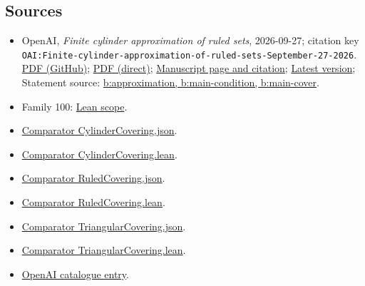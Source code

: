 \documentclass[11pt]{article}
\begin{document}
\subsection{Sources}
\begin{itemize}
\item OpenAI, \emph{Finite cylinder approximation of ruled sets}, 2026-09-27; citation key \texttt{OAI:Finite-cylinder-approximation-of-ruled-sets-September-27-2026}. \href{https://github.com/openai/math/blob/adc7f1241b42e322a6451854ab7e4b4c146bf78a/preprints/Finite-cylinder-approximation-of-ruled-sets-September-27-2026/main.pdf}{PDF (GitHub)}; \href{https://github.com/openai/math/raw/adc7f1241b42e322a6451854ab7e4b4c146bf78a/preprints/Finite-cylinder-approximation-of-ruled-sets-September-27-2026/main.pdf}{PDF (direct)}; \href{https://github.com/openai/math/blob/adc7f1241b42e322a6451854ab7e4b4c146bf78a/preprints/Finite-cylinder-approximation-of-ruled-sets-September-27-2026/README.md}{Manuscript page and citation}; \href{https://github.com/openai/math/blob/main/preprints/Finite-cylinder-approximation-of-ruled-sets-September-27-2026/main.pdf}{Latest version}; Statement source: \href{https://github.com/openai/math/blob/adc7f1241b42e322a6451854ab7e4b4c146bf78a/preprints/Finite-cylinder-approximation-of-ruled-sets-September-27-2026/build/sections/introduction.tex\#L74}{b:approximation, b:main-condition, b:main-cover}.
\item Family 100: \href{https://github.com/openai/math/blob/adc7f1241b42e322a6451854ab7e4b4c146bf78a/lean/docs/100.md}{Lean scope}.
\item \href{https://github.com/openai/math/blob/adc7f1241b42e322a6451854ab7e4b4c146bf78a/lean/ComparatorChallenges/CylinderCovering.json}{Comparator CylinderCovering.json}.
\item \href{https://github.com/openai/math/blob/adc7f1241b42e322a6451854ab7e4b4c146bf78a/lean/ComparatorChallenges/CylinderCovering.lean}{Comparator CylinderCovering.lean}.
\item \href{https://github.com/openai/math/blob/adc7f1241b42e322a6451854ab7e4b4c146bf78a/lean/ComparatorChallenges/RuledCovering.json}{Comparator RuledCovering.json}.
\item \href{https://github.com/openai/math/blob/adc7f1241b42e322a6451854ab7e4b4c146bf78a/lean/ComparatorChallenges/RuledCovering.lean}{Comparator RuledCovering.lean}.
\item \href{https://github.com/openai/math/blob/adc7f1241b42e322a6451854ab7e4b4c146bf78a/lean/ComparatorChallenges/TriangularCovering.json}{Comparator TriangularCovering.json}.
\item \href{https://github.com/openai/math/blob/adc7f1241b42e322a6451854ab7e4b4c146bf78a/lean/ComparatorChallenges/TriangularCovering.lean}{Comparator TriangularCovering.lean}.
\item \href{https://github.com/openai/math/blob/adc7f1241b42e322a6451854ab7e4b4c146bf78a/CONTENTS.md}{OpenAI catalogue entry}.
\end{itemize}
\end{document}

